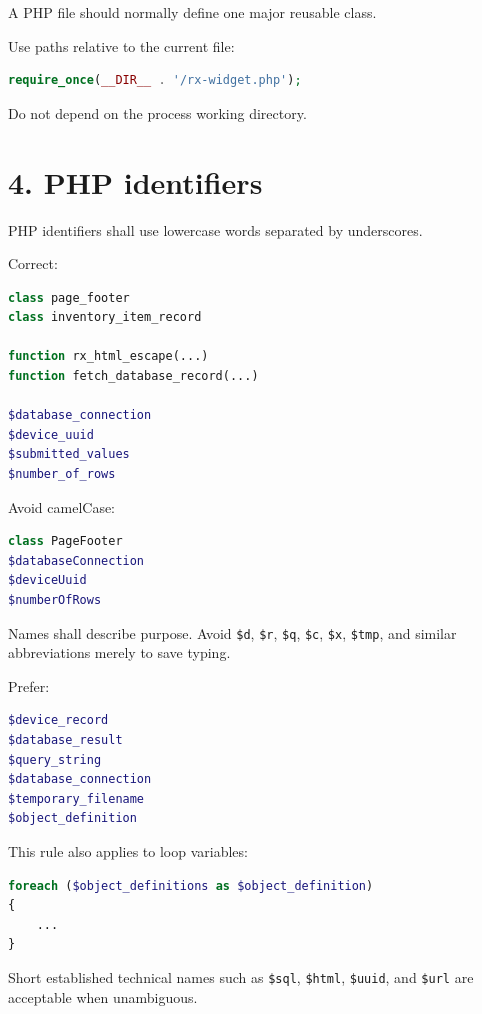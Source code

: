 \documentclass[11pt,a4paper]{article}
\begin{document}
A PHP file should normally define one major reusable class.

Use paths relative to the current file:

\begin{lstlisting}[language=PHP]
require_once(__DIR__ . '/rx-widget.php');
\end{lstlisting}

Do not depend on the process working directory.

\section{4. PHP identifiers}\label{4-php-identifiers}

PHP identifiers shall use lowercase words separated by underscores.

Correct:

\begin{lstlisting}[language=PHP]
class page_footer
class inventory_item_record

function rx_html_escape(...)
function fetch_database_record(...)

$database_connection
$device_uuid
$submitted_values
$number_of_rows
\end{lstlisting}

Avoid camelCase:

\begin{lstlisting}[language=PHP]
class PageFooter
$databaseConnection
$deviceUuid
$numberOfRows
\end{lstlisting}

Names shall describe purpose. Avoid \passthrough{\lstinline!$d!},
\passthrough{\lstinline!$r!}, \passthrough{\lstinline!$q!},
\passthrough{\lstinline!$c!}, \passthrough{\lstinline!$x!},
\passthrough{\lstinline!$tmp!}, and similar abbreviations merely to save
typing.

Prefer:

\begin{lstlisting}[language=PHP]
$device_record
$database_result
$query_string
$database_connection
$temporary_filename
$object_definition
\end{lstlisting}

This rule also applies to loop variables:

\begin{lstlisting}[language=PHP]
foreach ($object_definitions as $object_definition)
{
    ...
}
\end{lstlisting}

Short established technical names such as
\passthrough{\lstinline!$sql!}, \passthrough{\lstinline!$html!},
\passthrough{\lstinline!$uuid!}, and \passthrough{\lstinline!$url!} are
acceptable when unambiguous.
\end{document}
